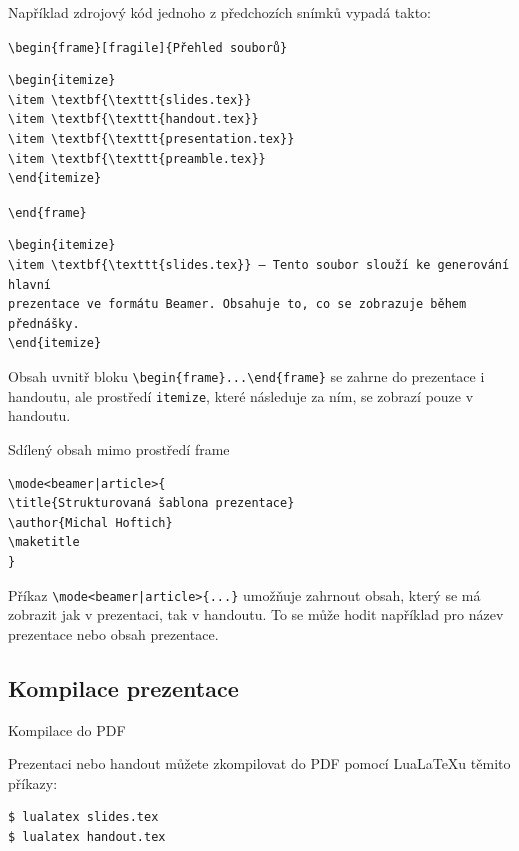 Například zdrojový kód jednoho z předchozích snímků vypadá takto:

\verb|\begin|\verb|{frame}[fragile]{Přehled souborů}|
\begin{verbatim}
\begin{itemize}
\item \textbf{\texttt{slides.tex}}
\item \textbf{\texttt{handout.tex}}
\item \textbf{\texttt{presentation.tex}}
\item \textbf{\texttt{preamble.tex}}
\end{itemize}
\end{verbatim}
\verb|\end|\verb|{frame}|

\begin{verbatim}
\begin{itemize}
\item \textbf{\texttt{slides.tex}} – Tento soubor slouží ke generování hlavní
prezentace ve formátu Beamer. Obsahuje to, co se zobrazuje během přednášky.
\end{itemize}
\end{verbatim}

Obsah uvnitř bloku \verb|\begin|\verb|{frame}...\end|\verb|{frame}| se zahrne
do prezentace i handoutu, ale prostředí \texttt{itemize}, které následuje za
ním, se zobrazí pouze v handoutu.

\begin{frame}[fragile]{Sdílený obsah mimo prostředí frame}

\begin{verbatim}
\mode<beamer|article>{
\title{Strukturovaná šablona prezentace}
\author{Michal Hoftich}
\maketitle
}
\end{verbatim}
\end{frame}

Příkaz \verb+\mode<beamer|article>{...}+ umožňuje zahrnout obsah, který se má
zobrazit jak v prezentaci, tak v handoutu. To se může hodit například pro název
prezentace nebo obsah prezentace.

\subsection{Kompilace prezentace}

\begin{frame}[fragile]{Kompilace do PDF}

Prezentaci nebo handout můžete zkompilovat do PDF pomocí LuaLaTeXu těmito příkazy:

\begin{verbatim}
$ lualatex slides.tex
$ lualatex handout.tex
\end{verbatim}
\end{frame}




